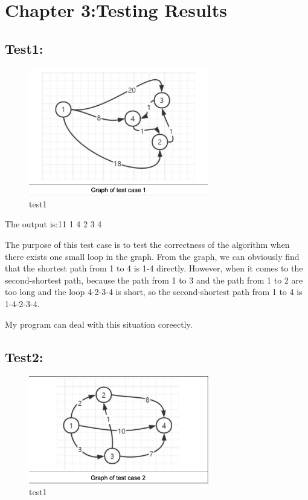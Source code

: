 \documentclass[12pt]{article}
\begin{document}
\section*{Chapter 3:Testing Results}

\subsection*{Test1:}
\begin{figure}[H]
	\centering
	\includegraphics[width=0.7\textwidth]{2.png}
	\caption{\label{pr}test1}
	\end{figure}
The output is:11 1 4 2 3 4

The purpose of this test case is to test the correctness of the algorithm when there exists one small loop in the graph. 
From the graph, we can obviously find that the shortest path from 1 to 4 is 1-4 directly. 
However, when it comes to the second-shortest path, because the path from 1 to 3 and the path from 1 to 2 are too long and the loop 4-2-3-4 is short, 
so the second-shortest path from 1 to 4 is 1-4-2-3-4. 

My program can deal with this situation coreectly.

\subsection*{Test2:}
\begin{figure}[H]
	\centering
	\includegraphics[width=0.7\textwidth]{3.png}
	\caption{\label{pr}test1}
	\end{figure}
\end{document}

